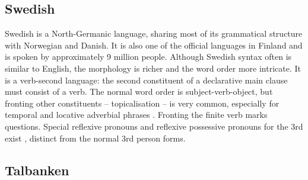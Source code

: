 \documentclass[runningheads,a4paper]{llncs}
\begin{document}
\subsection{Swedish}

Swedish is a North-Germanic language, sharing most of its grammatical structure 
with Norwegian and Danish. It is also one of the official languages in Finland
and is spoken by approximately 9 million people.
Although Swedish syntax often is similar to English, the  morphology is richer and the
word order more intricate.
It is a verb-second language: %
the second constituent of a declarative main clause must consist of a verb.
The normal word order is subject-verb-object, but fronting other constituents
-- topicalisation -- is very common,  especially for temporal and
locative adverbial phrases \cite[]{H&H}.
Fronting the finite verb marks questions.
Special reflexive pronouns and reflexive possessive pronouns for the 3rd
exist \cite[ \& 319]{H&H}, distinct from the normal 3rd person forms.






\subsection{Talbanken}
\end{document}
